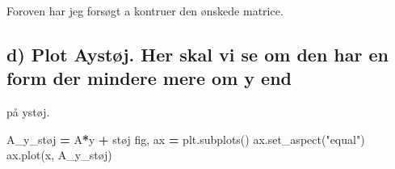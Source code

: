 \documentclass[
]{article}
\newenvironment{Shaded}{\begin{snugshade}}{\end{snugshade}}
\newcommand{\NormalTok}[1]{#1}
\newcommand{\OperatorTok}[1]{\textcolor[rgb]{0.81,0.36,0.00}{\textbf{#1}}}
\newcommand{\StringTok}[1]{\textcolor[rgb]{0.31,0.60,0.02}{#1}}
\begin{document}
Foroven har jeg forsøgt a kontruer den ønskede matrice.

\hypertarget{d-plot-aystuxf8j.-her-skal-vi-se-om-den-har-en-form-der-mindere-mere-om-y-end}{%
\subsection{d) Plot Aystøj. Her skal vi se om den har en form der
mindere mere om y
end}\label{d-plot-aystuxf8j.-her-skal-vi-se-om-den-har-en-form-der-mindere-mere-om-y-end}}

på ystøj.

\begin{Shaded}
\begin{Highlighting}[]
\NormalTok{A\_y\_støj }\OperatorTok{=}\NormalTok{ A}\OperatorTok{*}\NormalTok{y }\OperatorTok{+}\NormalTok{ støj}
\NormalTok{fig, ax }\OperatorTok{=}\NormalTok{ plt.subplots()}
\NormalTok{ax.set\_aspect(}\StringTok{"equal"}\NormalTok{)}
\NormalTok{ax.plot(x, A\_y\_støj)}
\end{Highlighting}
\end{Shaded}
\end{document}
